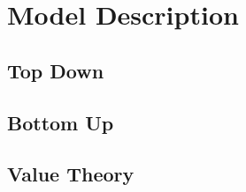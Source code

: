 \section{Model Description}\label{sec:model_description}
\subsection{Top Down}\label{subsec:model_descriptions_top_down}
\subsection{Bottom Up}\label{subsec:model_descriptions_bottom_up}
\subsection{Value Theory}\label{subsec:model_descriptions_value_theory}